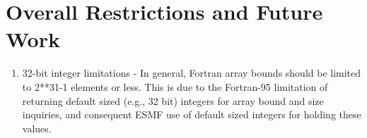 
\section{Overall Restrictions and Future Work}
\label{sec:overallrest}

\begin{enumerate}

\item 32-bit integer limitations - In general, Fortran array bounds should
be limited to 2**31-1 elements or less.  This is due to the Fortran-95
limitation of returning default sized (e.g., 32 bit) integers for array bound
and size inquiries, and consequent ESMF use of default sized integers for
holding these values.

\end{enumerate}
